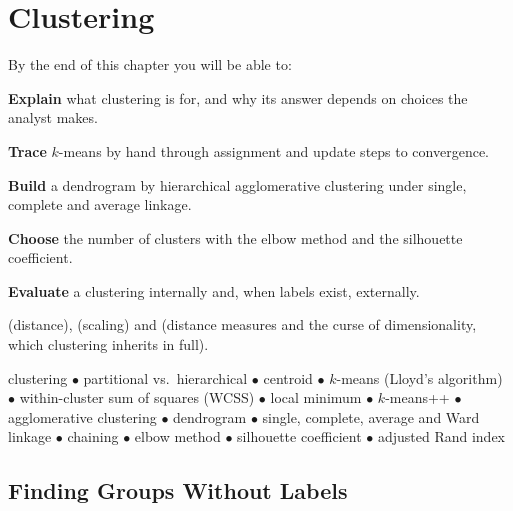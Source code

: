 \chapter{Clustering}\label{ch:clustering}

\begin{outcomes}
By the end of this chapter you will be able to:
\begin{tight}
  \item \textbf{Explain} what clustering is for, and why its answer depends on
        choices the analyst makes.
  \item \textbf{Trace} $k$-means by hand through assignment and update steps to
        convergence.
  \item \textbf{Build} a dendrogram by hierarchical agglomerative clustering under
        single, complete and average linkage.
  \item \textbf{Choose} the number of clusters with the elbow method and the
        silhouette coefficient.
  \item \textbf{Evaluate} a clustering internally and, when labels exist,
        externally.
\end{tight}
\end{outcomes}

\begin{prereq}
 (distance),  (scaling) and  (distance
measures and the curse of dimensionality, which clustering inherits in full).
\end{prereq}

\begin{keyterms}
clustering $\bullet$ partitional vs.\ hierarchical $\bullet$ centroid $\bullet$
$k$-means (Lloyd's algorithm) $\bullet$ within-cluster sum of squares (WCSS)
$\bullet$ local minimum $\bullet$ $k$-means++ $\bullet$ agglomerative clustering
$\bullet$ dendrogram $\bullet$ single, complete, average and Ward linkage
$\bullet$ chaining $\bullet$ elbow method $\bullet$ silhouette coefficient
$\bullet$ adjusted Rand index
\end{keyterms}

\section{Finding Groups Without Labels}

